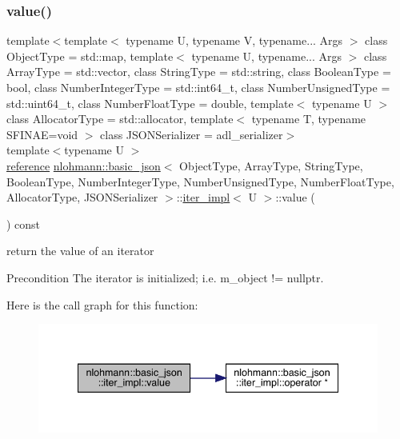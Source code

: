 \subsubsection{\texorpdfstring{value()}{value()}}
{\footnotesize\ttfamily template$<$template$<$ typename U, typename V, typename... Args $>$ class Object\+Type = std\+::map, template$<$ typename U, typename... Args $>$ class Array\+Type = std\+::vector, class String\+Type  = std\+::string, class Boolean\+Type  = bool, class Number\+Integer\+Type  = std\+::int64\+\_\+t, class Number\+Unsigned\+Type  = std\+::uint64\+\_\+t, class Number\+Float\+Type  = double, template$<$ typename U $>$ class Allocator\+Type = std\+::allocator, template$<$ typename T, typename S\+F\+I\+N\+A\+E=void $>$ class J\+S\+O\+N\+Serializer = adl\+\_\+serializer$>$ \\
template$<$typename U $>$ \\
\mbox{\hyperlink{classnlohmann_1_1basic__json_1_1iter__impl_ae09599e9cb4a947020a0265c0c4f3d5e}{reference}} \mbox{\hyperlink{classnlohmann_1_1basic__json}{nlohmann\+::basic\+\_\+json}}$<$ Object\+Type, Array\+Type, String\+Type, Boolean\+Type, Number\+Integer\+Type, Number\+Unsigned\+Type, Number\+Float\+Type, Allocator\+Type, J\+S\+O\+N\+Serializer $>$\+::\mbox{\hyperlink{classnlohmann_1_1basic__json_1_1iter__impl}{iter\+\_\+impl}}$<$ U $>$\+::value (\begin{DoxyParamCaption}{ }\end{DoxyParamCaption}) const\hspace{0.3cm}{\ttfamily [inline]}}



return the value of an iterator 

\begin{DoxyPrecond}{Precondition}
The iterator is initialized; i.\+e. {\ttfamily m\+\_\+object != nullptr}. 
\end{DoxyPrecond}
Here is the call graph for this function\+:
\nopagebreak
\begin{figure}[H]
\begin{center}
\leavevmode
\includegraphics[width=341pt]{classnlohmann_1_1basic__json_1_1iter__impl_a92e849ca687355935c02f492be936b68_cgraph}
\end{center}
\end{figure}


